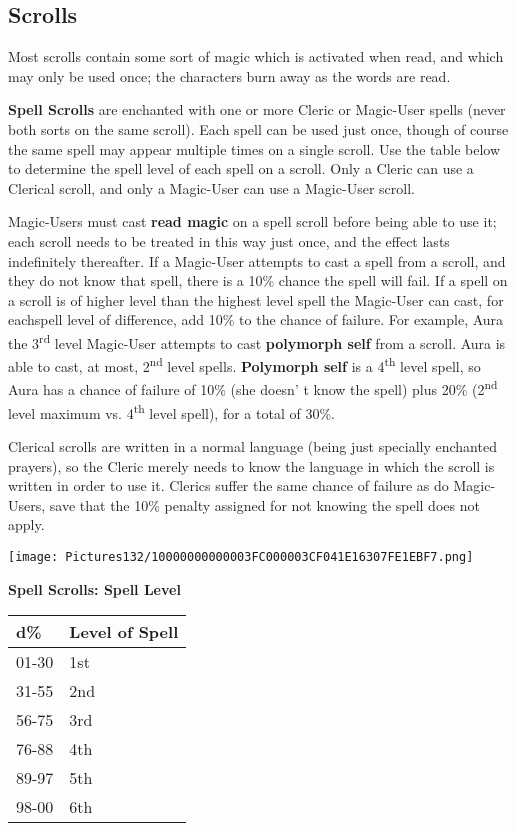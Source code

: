 \documentclass[a4paper,twoside,openany,10pt]{book}
\begin{document}
\begin{multicols}{2}
\subsection{Scrolls}\label{scrolls-1}

Most scrolls contain some sort of magic which is activated when read, and which may only be used once; the characters burn away as the words are read.

\textbf{Spell Scrolls} are enchanted with one or more Cleric or Magic-User spells (never both sorts on the same scroll). Each spell can be used just once, though of course the same spell may appear multiple times on a single scroll. Use the table below to determine the spell level of each spell on a scroll. Only a Cleric can use a Clerical scroll, and only a Magic-User can use a Magic-User scroll.

Magic-Users must cast \textbf{read magic} on a spell scroll before being able to use it; each scroll needs to be treated in this way just once, and the effect lasts indefinitely thereafter. If a Magic-User attempts to cast a spell from a scroll, and they do not know that spell, there is a 10\% chance the spell will fail. If a spell on a scroll is of higher level than the highest level spell the Magic-User can cast, for eachspell level of difference, add 10\% to the chance of failure. For example, Aura the 3\textsuperscript{rd} level Magic-User attempts to cast \textbf{polymorph self} from a scroll. Aura is able to cast, at most, 2\textsuperscript{nd} level spells. \textbf{Polymorph self} is a 4\textsuperscript{th} level spell, so Aura has a chance of failure of 10\% (she doesn' t know the spell) plus 20\% (2\textsuperscript{nd} level maximum vs. 4\textsuperscript{th} level spell), for a total of 30\%.

Clerical scrolls are written in a normal language (being just specially enchanted prayers), so the Cleric merely needs to know the language in which the scroll is written in order to use it. Clerics suffer the same chance of failure as do Magic-Users, save that the 10\% penalty assigned for not knowing the spell does not apply. 

\begin{flushleft} \texttt{[image: Pictures132/10000000000003FC000003CF041E16307FE1EBF7.png]}  \end{flushleft}


\textbf{Spell Scrolls: Spell Level}

\begin{tabular*}{0.93\linewidth}{@{\extracolsep{\fill}}ll}
\textbf{d\%} & \textbf{Level of Spell} \\\toprule
01-30 & 1st \\\hline
31-55 & 2nd \\\hline
56-75 & 3rd \\\hline
76-88 & 4th \\\hline
89-97 & 5th \\\hline
98-00 & 6th \\\bottomrule
\end{tabular*}\medskip


\end{multicols}
\end{document}
